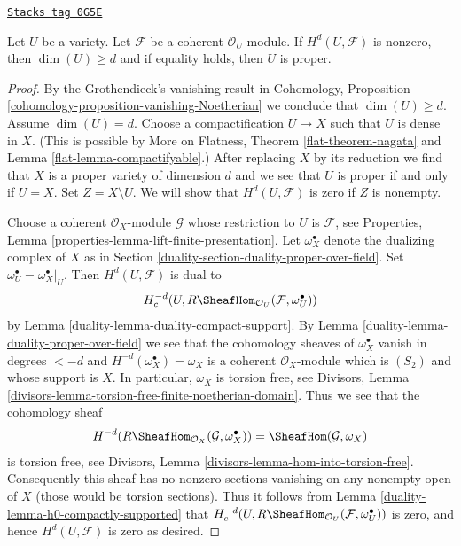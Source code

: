 \begin{lemma}[Lichtenbaum]
\label{duality-lemma-lichtenbaum}
\href{https://stacks.math.columbia.edu/tag/0G5E}{\texttt{Stacks tag 0G5E}}

Let $U$ be a variety. Let $\mathcal{F}$ be a coherent $\mathcal{O}_U$-module.
If $H^d(U, \mathcal{F})$ is nonzero, then $\dim(U) \geq d$ and if
equality holds, then $U$ is proper.
\end{lemma}

\begin{proof}

By the Grothendieck's vanishing result in
Cohomology, Proposition \ref{cohomology-proposition-vanishing-Noetherian}
we conclude that $\dim(U) \geq d$.
Assume $\dim(U) = d$. Choose a compactification $U \to X$
such that $U$ is dense in $X$. (This is possible by
More on Flatness, Theorem \ref{flat-theorem-nagata} and
Lemma \ref{flat-lemma-compactifyable}.) After replacing $X$ by its
reduction we find that $X$ is a proper variety of dimension $d$
and we see that $U$ is proper if and only if $U = X$.
Set $Z = X \setminus U$. We will show that $H^d(U, \mathcal{F})$
is zero if $Z$ is nonempty.

\medskip\noindent
Choose a coherent $\mathcal{O}_X$-module
$\mathcal{G}$ whose restriction to $U$ is $\mathcal{F}$, see
Properties, Lemma \ref{properties-lemma-lift-finite-presentation}.
Let $\omega_X^\bullet$ denote the dualizing complex of $X$ as in
Section \ref{duality-section-duality-proper-over-field}.
Set $\omega_U^\bullet = \omega_X^\bullet|_U$.
Then $H^d(U, \mathcal{F})$ is dual to
$$
H^{-d}_c(U, R\SheafHom_{\mathcal{O}_U}(\mathcal{F}, \omega_U^\bullet))
$$
by Lemma \ref{duality-lemma-duality-compact-support}. By
Lemma \ref{duality-lemma-duality-proper-over-field} we see that
the cohomology sheaves of $\omega_X^\bullet$ vanish in degrees $< -d$
and $H^{-d}(\omega_X^\bullet) = \omega_X$ is a coherent
$\mathcal{O}_X$-module which is $(S_2)$ and whose support is $X$.
In particular, $\omega_X$ is torsion free, see
Divisors, Lemma \ref{divisors-lemma-torsion-free-finite-noetherian-domain}.
Thus we see that the cohomology sheaf
$$
H^{-d}(R\SheafHom_{\mathcal{O}_X}(\mathcal{G}, \omega_X^\bullet)) =
\SheafHom(\mathcal{G}, \omega_X)
$$
is torsion free, see
Divisors, Lemma \ref{divisors-lemma-hom-into-torsion-free}.
Consequently this sheaf has no nonzero sections vanishing
on any nonempty open of $X$ (those would be torsion sections).
Thus it follows from Lemma \ref{duality-lemma-h0-compactly-supported} that
$H^{-d}_c(U, R\SheafHom_{\mathcal{O}_U}(\mathcal{F}, \omega_U^\bullet))$
is zero, and hence $H^d(U, \mathcal{F})$ is zero as desired.
\end{proof}

